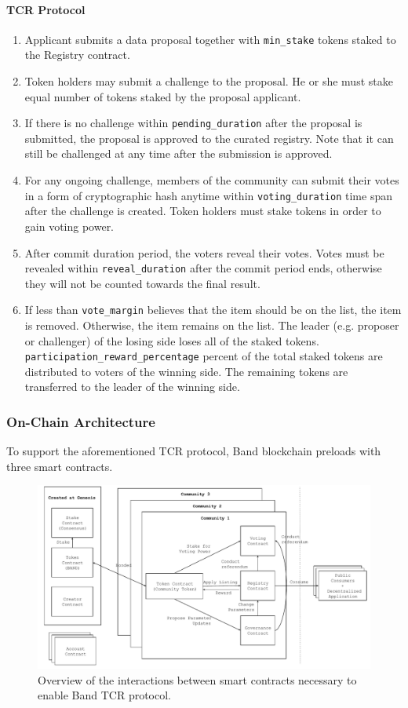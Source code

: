 \documentclass[letterpaper,11pt]{article}
\begin{document}
\paragraph{TCR Protocol}
\begin{enumerate}
\item Applicant submits a data proposal together with {\tt min\_stake} tokens staked to the Registry contract. 
\item Token holders may submit a challenge to the proposal. He or she must stake equal number of tokens staked by the proposal applicant.
\item If there is no challenge within {\tt pending\_duration} after the proposal is submitted, the proposal is approved to the curated registry. Note that it can still be challenged at any time after the submission is approved.
\item For any ongoing challenge, members of the community can submit their votes in a form of cryptographic hash anytime within {\tt voting\_duration} time span after the challenge is created. Token holders must stake tokens in order to gain voting power.
\item After commit duration period, the voters reveal their votes. Votes must be revealed within {\tt reveal\_duration} after the commit period ends, otherwise they will not be counted towards the final result.
\item If less than {\tt vote\_margin} believes that the item should be on the list, the item is removed. Otherwise, the item remains on the list. The leader (e.g. proposer or challenger) of the losing side loses all of the staked tokens. {\tt participation\_reward\_percentage} percent of the total staked tokens are distributed to voters of the winning side. The remaining tokens are transferred to the leader of the winning side.
\end{enumerate}

\subsubsection{On-Chain Architecture}
To support the aforementioned TCR protocol, Band blockchain preloads with three smart contracts. 

\begin{figure}[ht!]
    \centering
    \includegraphics[width=\textwidth]{tcr}
	\captionsetup{labelformat=empty}
    \caption{Overview of the interactions between smart contracts necessary to enable Band TCR protocol.}
    \label{fig:tcr}
\end{figure}
\end{document}
